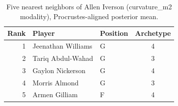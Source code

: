 \begin{table}[htbp]
  \centering\small
  \begin{tabular}{rllc}
    \toprule
    Rank & Player & Position & Archetype \\
    \midrule
    1 & Jeenathan Williams & G & 4 \\
    2 & Tariq Abdul-Wahad & G & 3 \\
    3 & Gaylon Nickerson & G & 4 \\
    4 & Morris Almond & G & 3 \\
    5 & Armen Gilliam & F & 4 \\
    \bottomrule
  \end{tabular}
  \caption{Five nearest neighbors of Allen Iverson (curvature_m2 modality), Procrustes-aligned posterior mean.}
  \label{tab:Allen_Iverson_neighbors_curvature_m2}
\end{table}


